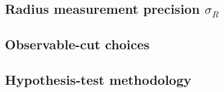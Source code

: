 

\subsection{Radius measurement precision \texorpdfstring{$\sigma_R$}{sigma\_R}}
\label{ssec:sigma_r}



\subsection{Observable-cut choices}
\label{ssec:cuts}

%


\subsection{Hypothesis-test methodology}
\label{ssec:methodology}




